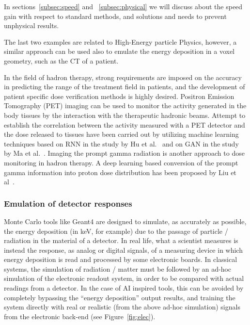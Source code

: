 In sections~\ref{subsec:speed} and ~\ref{subsec:physical} we will discuss about the speed gain with respect to standard methods, and solutions and needs to prevent unphysical results.

The last two examples are related to High-Energy particle Physics, however, a similar approach can be used also to emulate the energy deposition in a voxel geometry, such as the CT of a patient.

In the field of hadron therapy, strong requirements are imposed on the accuracy in predicting the range of the treatment field in patients, and the development of patient specific dose verification methods is highly desired. Positron Emission Tomography (PET) imaging can be used to monitor the activity generated in the body tissues by the interaction with the therapeutic hadronic beams. Attempt to establish the correlation between the activity measured with a PET detector and the dose released to tissues have been carried out by utilizing  machine learning techniques based on RNN in the study by Hu et al.~\cite{Hu2020} and on GAN in the study by Ma et al.~\cite{Ma2020c}. Imaging the prompt gamma radiation is another approach to dose monitoring in hadron therapy. A deep learning based conversion of the prompt gamma information into proton dose distribution has been proposed by Liu et al~\cite{Liu2020a}. 


\subsubsection{Emulation of detector responses}
Monte Carlo tools like Geant4 are designed to simulate, as accurately as possible, the energy deposition (in keV, for example) due to the passage of particle / radiation in the material of a detector. In real life, what a scientist measures is instead the response, as analog or digital signals, of a measuring device in which energy deposition is read and processed by some electronic boards. In classical systems, the simulation of radiation / matter must be followed by an ad-hoc simulation of the electronic readout system, in order to be compared with actual readings from a detector. In the case of AI inspired tools, this can be avoided by completely bypassing the ``energy deposition'' output results, and training the system directly with real or realistic (from the above ad-hoc simulation) signals from the electronic back-end  (see Figure~\ref{fig:elec}).

